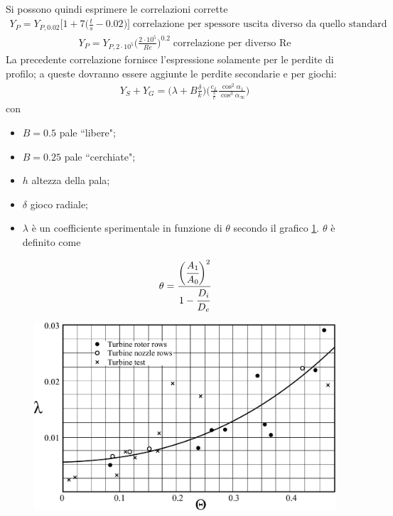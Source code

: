 Si possono quindi esprimere le correlazioni corrette
\begin{align*}
Y_P = Y_{P,0.02} \bigg[ 1 + 7 \bigg( \frac{t}{s} - 0.02 \bigg) \bigg] \; \mbox{correlazione per spessore uscita diverso da quello standard}
\end{align*}
\begin{align*}
Y_P = Y_{P,2 \cdot 10^5} \bigg( \frac{2 \cdot 10^5}{Re} \bigg)^{0.2} \; \mbox{correlazione per diverso Re}
\end{align*}
La precedente correlazione fornisce l'espressione solamente per le perdite di profilo; a queste dovranno essere aggiunte le perdite secondarie e per giochi:
\begin{align*}
Y_S + Y_G = \Big( \lambda + B \frac{\delta}{k} \Big) \Bigg( \frac{c_L}{\frac{s}{c}} \frac{\cos^2 \alpha_1}{\cos^3 \alpha_{\infty}} \Bigg)
\end{align*}
con
\begin{itemize}
\item $B = 0.5$ pale ``libere";
\item $B = 0.25$ pale ``cerchiate";
\item $h$ altezza della pala;
\item $\delta$ gioco radiale;
\item $\lambda$ è un coefficiente sperimentale in funzione di $\theta$ secondo il grafico \ref{fig:lambdaPerditeSchiera}. $\theta$ è definito come
\end{itemize}
\begin{align*}
\theta = \cfrac{\bigg(\cfrac{A_1}{A_0}\bigg)^2}{1- \cfrac{D_i}{D_e}}
\end{align*}
\begin{figure}
\centering
  \includegraphics[width=.6\textwidth]{fig/lambdaPerditeSchiera.pdf}
\caption{}
\label{fig:lambdaPerditeSchiera}
\end{figure}

